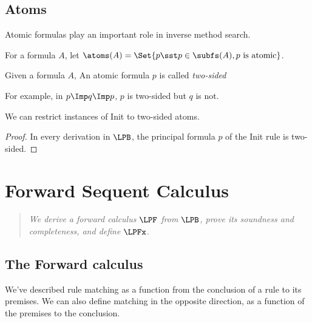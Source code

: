 \subsection{Atoms}

Atomic formulas play an important role in inverse method search.

\begin{definition}
  For a formula $A$, let
  $\atoms(A)=\Set{p\sst p\in\subfs(A), p \mbox{ is atomic}}$.
\end{definition}

\begin{definition}
  Given a formula $A$,
  An atomic formula $p$ is called \emph{two-sided}
\end{definition}

\noindent For example, in $p \Imp q \Imp p$, $p$ is two-sided but $q$ is not.

\begin{theorem}
  We can restrict instances of Init to two-sided atoms.
\end{theorem}
\begin{proof}
  In every derivation in $\LPB$, the principal formula $p$ of the Init rule is
two-sided.
\end{proof}


\section{Forward Sequent Calculus}

\begin{quote}
  \textit{
    We derive a forward calculus $\LPF$ from $\LPB$, prove its soundness
    and completeness, and define $\LPFx$.
  }
\end{quote}

\subsection{The Forward calculus}

We've described rule matching as a function from the conclusion
of a rule to its premises.  We can also define matching in the
opposite direction, as a function of the premises to the conclusion.

